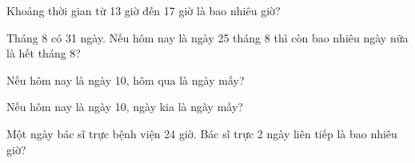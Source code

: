 \begin{ex}
Khoảng thời gian từ 13 giờ đến 17 giờ là bao nhiêu giờ?
\end{ex}

\begin{ex}
Tháng 8 có 31 ngày. Nếu hôm nay là ngày 25 tháng 8 thì còn bao nhiêu ngày nữa là hết tháng 8?
\end{ex}

\begin{ex}
Nếu hôm nay là ngày 10, hôm qua là ngày mấy?
\end{ex}

\begin{ex}
Nếu hôm nay là ngày 10, ngày kia là ngày mấy?
\end{ex}

\begin{ex}
Một ngày bác sĩ trực bệnh viện 24 giờ. Bác sĩ trực 2 ngày liên tiếp là bao nhiêu giờ?
\end{ex}
